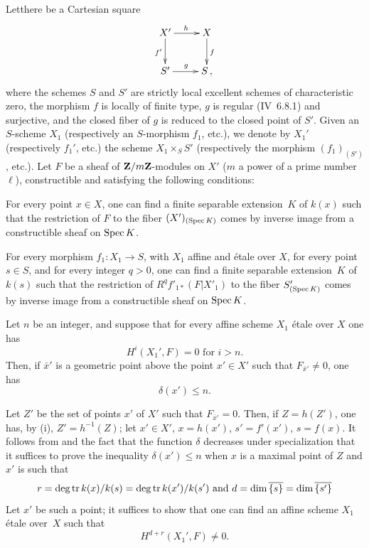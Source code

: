 \begin{proposition} \label{XIV.3.5}
Let\pageoriginale there be a Cartesian square
$$
\xymatrix{
{X'}\ar[r]^h\ar[d]_{f'} &{X}\ar[d]^f\\
{S'}\ar[r]^g &{S}\,,
}
$$
where the schemes $S$ and $S'$ are strictly local excellent schemes of characteristic zero, the morphism $f$ is locally of finite type, $g$ is regular (\textup{\EGA IV~6.8.1}) and surjective, and the closed fiber of $g$ is reduced to the closed point of $S'$. Given an $S$-scheme $X_1$ (respectively an $S$-morphism $f_1$, etc.), we denote by $X_1'$ (respectively $f_1'$, etc.) the scheme $X_1 \times_S S'$ (respectively the morphism $(f_1)_{(S')}$, etc.). Let $F$ be a sheaf of $\mathbf Z/m\mathbf Z$-modules on $X'$ ($m$ a power of a prime number $\ell$), constructible and satisfying the following conditions:
\begin{enumeratei}
\item
For every point $x \in X$, one can find a finite separable extension~$K$ of $k(x)$ such that the restriction of $F$ to the fiber $(X')_{(\operatorname{Spec} K)}$ comes by inverse image from a constructible sheaf on $\operatorname{Spec} K$.
\item
For every morphism $f_1: X_1 \to S$, with $X_1$ affine and étale over $X$, for every point $s \in S$, and for every integer $q>0$, one can find a finite separable extension~$K$ of $k(s)$ such that the restriction of $R^q f'_{1*}(F|X'_1)$ to the fiber $S'_{(\operatorname{Spec} K)}$ comes by inverse image from a constructible sheaf on $\operatorname{Spec} K$.
\end{enumeratei}

Let $n$ be an integer, and suppose that for every affine scheme $X_1$ étale over $X$ one has\pageoriginale
$$
H^i(X_1', F)=0 \text{ for } i>n.
$$
Then, if $\bar{x}'$ is a geometric point above the point $x' \in X'$ such that $F_{\bar{x}'} \neq 0$, one has
$$
\delta(x') \leq n.
$$
\end{proposition}

Let $Z'$ be the set of points $x'$ of $X'$ such that $F_{\bar{x}'} = 0$. Then, if $Z=h(Z')$, one has, by \textup{(i)}, $Z' = h^{-1}(Z)$; let $x' \in X'$, $x=h(x')$, $s'=f'(x')$, $s=f(x)$. It follows from  and the fact that the function $\delta$ decreases under specialization that it suffices to prove the inequality $\delta(x') \leq n$ when $x$ is a maximal point of $Z$ and $x'$ is such that
$$r=\deg \operatorname{tr} k(x)/k(s) = \deg \operatorname{tr} k(x')/k(s') \text{ and }d=\dim \overline{\{s\}} = \dim\overline{\{s'\}}$$
Let $x'$ be such a point; it suffices to show that one can find an affine scheme $X_1$ \'{e}tale over~$X$ such that
$$
H^{d+r}(X_1', F) \neq 0.
$$

